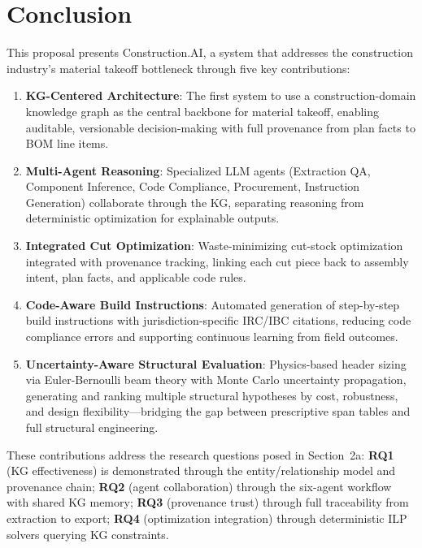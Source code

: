 
\section{Conclusion}

This proposal presents Construction.AI, a system that addresses the construction industry's material takeoff bottleneck through five key contributions:

\begin{enumerate}
  \item \textbf{KG-Centered Architecture}: The first system to use a construction-domain knowledge graph as the central backbone for material takeoff, enabling auditable, versionable decision-making with full provenance from plan facts to BOM line items.

  \item \textbf{Multi-Agent Reasoning}: Specialized LLM agents (Extraction QA, Component Inference, Code Compliance, Procurement, Instruction Generation) collaborate through the KG, separating reasoning from deterministic optimization for explainable outputs.

  \item \textbf{Integrated Cut Optimization}: Waste-minimizing cut-stock optimization integrated with provenance tracking, linking each cut piece back to assembly intent, plan facts, and applicable code rules.

  \item \textbf{Code-Aware Build Instructions}: Automated generation of step-by-step build instructions with jurisdiction-specific IRC/IBC citations, reducing code compliance errors and supporting continuous learning from field outcomes.

  \item \textbf{Uncertainty-Aware Structural Evaluation}: Physics-based header sizing via Euler-Bernoulli beam theory with Monte Carlo uncertainty propagation, generating and ranking multiple structural hypotheses by cost, robustness, and design flexibility---bridging the gap between prescriptive span tables and full structural engineering.
\end{enumerate}

These contributions address the research questions posed in Section~2a:
\textbf{RQ1} (KG effectiveness) is demonstrated through the entity/relationship model and provenance chain;
\textbf{RQ2} (agent collaboration) through the six-agent workflow with shared KG memory;
\textbf{RQ3} (provenance trust) through full traceability from extraction to export;
\textbf{RQ4} (optimization integration) through deterministic ILP solvers querying KG constraints.


